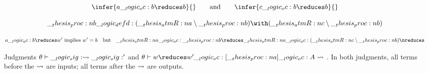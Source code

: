 \begin{equation*}
  \infer{a \oc b \reduces b}{}
  \qquad\text{and}\qquad
  \infer{c \oc b \reduces b}{}
\end{equation*}

\begin{equation*}
  \proc{b} \defd (\atmR{a} \limp \proc{b}) \with (\atmR{c} \limp \proc{b})
\end{equation*}

\begin{equation*}
  a \oc b \reduces w' \text{ implies $w' = b$}
  \quad\text{but}\quad
  \atmR{a} \oc \proc{b} \reduces \atmR{a} \oc (\atmR{c} \limp \proc{b}) \nreduces
\end{equation*}

\autocite{McDowell+:TCS03}


Judgments $\theta \vdash \__logic_sig: \rightsquigarrow \__logic_sig:'$ and $\chorax{\theta}{w \reduces w'}{\proc{a}}{A}$.
In both judgments, all terms before the $\rightsquigarrow$ are inputs; all terms after the $\rightsquigarrow$ are outputs.



